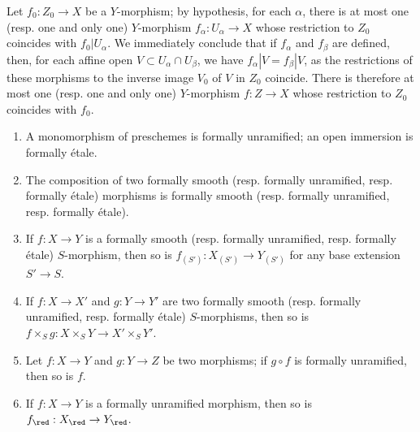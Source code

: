 \begin{remark}[17.1.2]
\begin{enumerate}
Let $f_0:Z_0\to X$ be a $Y$-morphism;
by hypothesis, for each $\alpha$, there is at most one (resp. one and only one) $Y$-morphism $f_\alpha:U_\alpha\to X$ whose restriction to $Z_0$ coincides with $f_0|U_\alpha$.
We immediately conclude that if $f_\alpha$ and $f_\beta$ are defined, then, for each affine open $V\subset U_\alpha\cap U_\beta$, we have $f_\alpha|V=f_\beta|V$, as the restrictions of these morphisms to the inverse image $V_0$ of $V$ in $Z_0$ coincide.
There is therefore at most one (resp. one and only one) $Y$-morphism $f:Z\to X$ whose restriction to $Z_0$ coincides with $f_0$.
\end{enumerate}
\end{remark}

\begin{proposition}[17.1.3]
\label{IV.17.1.3}
\medskip\noindent
\begin{enumerate}
  \item[{\rm(i)}] A monomorphism of preschemes is formally unramified;
    an open immersion is formally \'etale.
  \item[{\rm(ii)}] The composition of two formally smooth (resp. formally unramified, resp. formally \'etale) morphisms is formally smooth (resp. formally unramified, resp. formally \'etale).
  \item[{\rm(iii)}] If $f:X\to Y$ is a formally smooth (resp. formally unramified, resp. formally \'etale) $S$-morphism, then so is $f_{(S')}:X_{(S')}\to Y_{(S')}$ for any base extension $S'\to S$.
  \item[{\rm(iv)}] If $f:X\to X'$ and $g:Y\to Y'$ are two formally smooth (resp. formally unramified, resp. formally \'etale) $S$-morphisms, then so is $f\times_S g:X\times_S Y\to X'\times_S Y'$.
  \item[{\rm(v)}] Let $f:X\to Y$ and $g:Y\to Z$ be two morphisms;
  if $g\circ f$ is formally unramified, then so is $f$.
  \item[{\rm(vi)}] If $f:X\to Y$ is a formally unramified morphism, then so is $f_\red:X_\red\to Y_\red$.
\end{enumerate}
\end{proposition}

